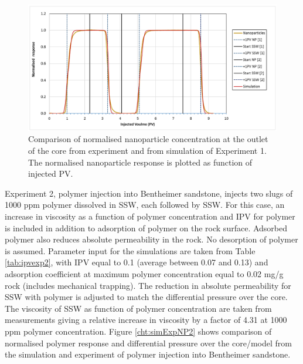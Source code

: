 \documentclass[journal = enfuem, manuscript =  article]{achemso}
\begin{document}
\begin{figure}[h]
    \centering
    \includegraphics[width=\textwidth]{fig/simExpNP.png}
    \caption{Comparison of normalised nanoparticle concentration at the outlet of the core from experiment and from simulation of Experiment 1. The normalised nanoparticle response is plotted as function of injected PV.}
    \label{cht:simExpNP}
\end{figure}

Experiment 2, polymer injection into Bentheimer sandstone, injects two slugs of 1000 ppm polymer dissolved in SSW, each followed by SSW. For this case, an increase in viscosity as a function of polymer concentration and IPV for polymer is included in addition to adsorption of polymer on the rock surface. Adsorbed polymer also reduces absolute permeability in the rock. No desorption of polymer is assumed. Parameter input for the simulations are taken from Table \ref{tab:ipvexp2}, with IPV equal to 0.1 (average between 0.07 and 0.13) and adsorption coefficient at maximum polymer concentration equal to 0.02 mg/g rock (includes mechanical trapping). The reduction in absolute permeability for SSW with polymer is adjusted to match the differential pressure over the core. The viscosity of SSW as function of polymer concentration are taken from measurements giving a relative increase in viscosity by a factor of 4.31 at 1000 ppm polymer concentration. Figure \ref{cht:simExpNP2} shows comparison of normalised polymer response and differential pressure over the core/model from the simulation and experiment of polymer injection into Bentheimer sandstone.
\end{document}
